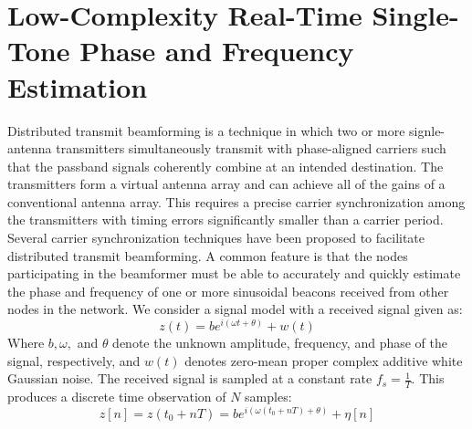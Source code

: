 \documentclass[oneside]{book}
\theoremstyle{mystyle}
\begin{document}
\section{Low-Complexity Real-Time Single-Tone Phase and Frequency Estimation}
Distributed transmit beamforming is a technique in which two or more signle-antenna transmitters simultaneously transmit with phase-aligned carriers such that the passband signals coherently combine at an intended destination. The transmitters form a virtual antenna array and can achieve all of the gains of a conventional antenna array. This requires a precise carrier synchronization among the transmitters with timing errors significantly smaller than a carrier period. Several carrier synchronization techniques have been proposed to facilitate distributed transmit beamforming. A common feature is that the nodes participating in the beamformer must be able to accurately and quickly estimate the phase and frequency of one or more sinusoidal beacons received from other nodes in the network. We consider a signal model with a received signal given as:
\begin{equation}
z(t) = be^{i(\omega t+\theta)}+w(t)
\end{equation}
Where $b,\omega,$ and $\theta$ denote the unknown amplitude, frequency, and phase of the signal, respectively, and $w(t)$ denotes zero-mean proper complex additive white Gaussian noise. The received signal is sampled at a constant rate $f_{s} = \frac{1}{T}$. This produces a discrete time observation of $N$ samples:
\begin{equation}
z[n] = z(t_{0}+nT) = be^{i(\omega(t_{0}+nT)+\theta)}+\eta[n]
\end{equation}
\end{document}
